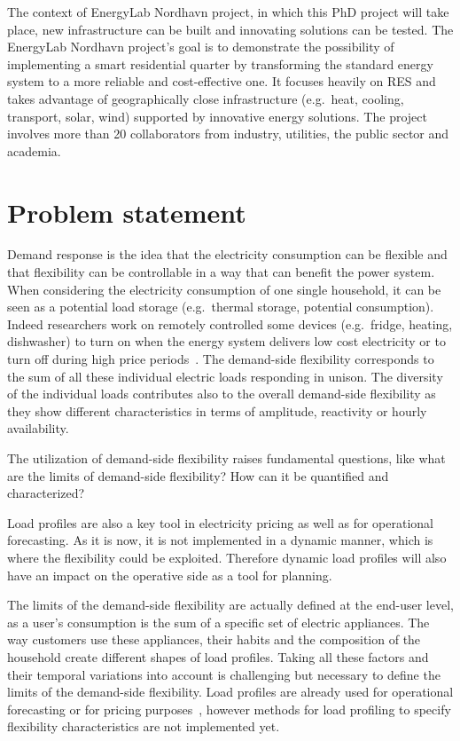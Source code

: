 \documentclass[fleqn,a4paper,twoside,10pt]{article}
\begin{document}
	The context of EnergyLab Nordhavn project, in which this PhD project will take place, new infrastructure can be built and innovating solutions can be tested. 
	The EnergyLab Nordhavn project's goal is to demonstrate the possibility of implementing a smart residential quarter by transforming the standard energy system to a more reliable and cost-effective one. 
	It focuses heavily on RES and takes advantage of geographically close infrastructure (e.g.\ heat, cooling, transport, solar, wind) supported by innovative energy solutions. 
	The project involves more than 20 collaborators from industry, utilities, the public sector and academia.

\section{Problem statement}
	Demand response is the idea that the electricity consumption can be flexible and that flexibility can be controllable in a way that can benefit the power system. 
	When considering the electricity consumption of one single household, it can be seen as a potential load storage (e.g.\ thermal storage, potential consumption). 
	Indeed researchers work on remotely controlled some devices (e.g.\ fridge, heating, dishwasher) to turn on when the energy system delivers low cost electricity or to turn off during high price periods~\cite{Oconnell2014}. 
	The demand-side flexibility corresponds to the sum of all these individual electric loads responding in unison. 
	The diversity of the individual loads contributes also to the overall demand-side flexibility as they show different characteristics in terms of amplitude, reactivity or hourly availability.
	
	The utilization of demand-side flexibility raises fundamental questions, like what are the limits of demand-side flexibility? How can it be quantified and characterized? 

	Load profiles are also a key tool in electricity pricing as well as for operational forecasting. 
	As it is now, it is not implemented in a dynamic manner, which is where the flexibility could be exploited. Therefore dynamic load profiles will also have an impact on the operative side as a tool for planning.
	
	The limits of the demand-side flexibility are actually defined at the end-user level, as a user's consumption is the sum of a specific set of electric appliances.
	The way customers use these appliances, their habits and the composition of the household create different shapes of load profiles. 
	Taking all these factors and their temporal variations into account is challenging but necessary to define the limits of the demand-side flexibility. 
	Load profiles are already used for operational forecasting or for pricing purposes~\cite{Ramos2013,figueiredo2005,kitayama2002}, however methods for load profiling to specify flexibility characteristics are not implemented yet.
\end{document}
